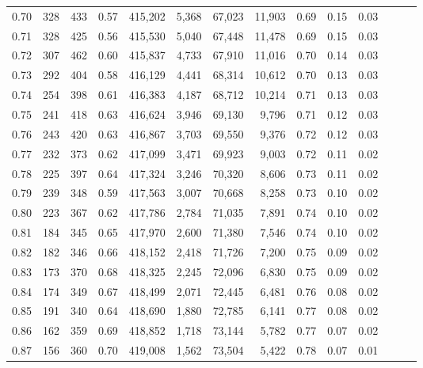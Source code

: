 \begin{tabular}{rrrrrrrrrrrrrr}
0.70 &     328 &    433 &  0.57 &  415,202 &    5,368 &  67,023 &  11,903 &  0.69 &  0.15 &      0.03 \\
0.71 &     328 &    425 &  0.56 &  415,530 &    5,040 &  67,448 &  11,478 &  0.69 &  0.15 &      0.03 \\
0.72 &     307 &    462 &  0.60 &  415,837 &    4,733 &  67,910 &  11,016 &  0.70 &  0.14 &      0.03 \\
0.73 &     292 &    404 &  0.58 &  416,129 &    4,441 &  68,314 &  10,612 &  0.70 &  0.13 &      0.03 \\
0.74 &     254 &    398 &  0.61 &  416,383 &    4,187 &  68,712 &  10,214 &  0.71 &  0.13 &      0.03 \\
0.75 &     241 &    418 &  0.63 &  416,624 &    3,946 &  69,130 &   9,796 &  0.71 &  0.12 &      0.03 \\
0.76 &     243 &    420 &  0.63 &  416,867 &    3,703 &  69,550 &   9,376 &  0.72 &  0.12 &      0.03 \\
0.77 &     232 &    373 &  0.62 &  417,099 &    3,471 &  69,923 &   9,003 &  0.72 &  0.11 &      0.02 \\
0.78 &     225 &    397 &  0.64 &  417,324 &    3,246 &  70,320 &   8,606 &  0.73 &  0.11 &      0.02 \\
0.79 &     239 &    348 &  0.59 &  417,563 &    3,007 &  70,668 &   8,258 &  0.73 &  0.10 &      0.02 \\
0.80 &     223 &    367 &  0.62 &  417,786 &    2,784 &  71,035 &   7,891 &  0.74 &  0.10 &      0.02 \\
0.81 &     184 &    345 &  0.65 &  417,970 &    2,600 &  71,380 &   7,546 &  0.74 &  0.10 &      0.02 \\
0.82 &     182 &    346 &  0.66 &  418,152 &    2,418 &  71,726 &   7,200 &  0.75 &  0.09 &      0.02 \\
0.83 &     173 &    370 &  0.68 &  418,325 &    2,245 &  72,096 &   6,830 &  0.75 &  0.09 &      0.02 \\
0.84 &     174 &    349 &  0.67 &  418,499 &    2,071 &  72,445 &   6,481 &  0.76 &  0.08 &      0.02 \\
0.85 &     191 &    340 &  0.64 &  418,690 &    1,880 &  72,785 &   6,141 &  0.77 &  0.08 &      0.02 \\
0.86 &     162 &    359 &  0.69 &  418,852 &    1,718 &  73,144 &   5,782 &  0.77 &  0.07 &      0.02 \\
0.87 &     156 &    360 &  0.70 &  419,008 &    1,562 &  73,504 &   5,422 &  0.78 &  0.07 &      0.01 \\

\end{tabular}
